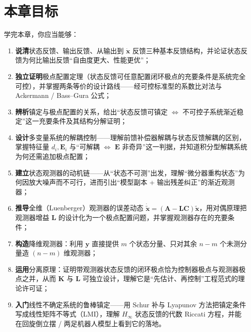 \section*{本章目标}
学完本章，你应当能够：
\begin{enumerate}
  \item \textbf{说清}状态反馈、输出反馈、从输出到 $\dot{\mathbf x}$ 反馈三种基本反馈结构，并论证状态反馈为何比输出反馈“自由度更大、性能更优”；
  \item \textbf{独立证明}极点配置定理（状态反馈可任意配置闭环极点的充要条件是系统完全可控），并掌握两条等价的设计路线——经可控标准型的系数比对法与 Ackermann / Bass--Gura 公式；
  \item \textbf{辨析}镇定与极点配置的关系，给出“状态反馈可镇定 $\iff$ 不可控子系统渐近稳定”这一充要条件及其结构分解证明；
  \item \textbf{设计}多变量系统的解耦控制——理解前馈补偿器解耦与状态反馈解耦的区别，掌握特征量 $d_i,\mathbf E_i$ 与“可解耦 $\iff$ $\mathbf E$ 非奇异”这一判据，并知道积分型解耦系统为何还需追加极点配置；
  \item \textbf{建立}状态观测器的动机链——从“状态不可测”出发，理解“微分器重构状态”为何因放大噪声而不可行，进而引出“模型副本 + 输出残差纠正”的渐近观测器；
  \item \textbf{推导}全维（Luenberger）观测器的误差动态 $\dot{\tilde{\mathbf x}}=(\mathbf A-\mathbf L\mathbf C)\tilde{\mathbf x}$，用对偶原理把观测器增益 $\mathbf L$ 的设计化为一个极点配置问题，并掌握观测器存在的充要条件；
  \item \textbf{构造}降维观测器：利用 $\mathbf y$ 直接提供 $m$ 个状态分量、只对其余 $n-m$ 个未测分量造 $(n-m)$ 维观测器；
  \item \textbf{运用}分离原理：证明带观测器状态反馈的闭环极点恰为控制器极点与观测器极点之并，从而 $\mathbf K$ 与 $\mathbf L$ 可独立设计，理解它是“先估计、再控制”工程范式的理论许可证；
  \item \textbf{入门}线性不确定系统的鲁棒镇定——用 Schur 补与 Lyapunov 方法把镇定条件写成线性矩阵不等式（LMI），理解 $H_\infty$ 状态反馈的代数 Riccati 方程，并能在回旋倒立摆 / 两足机器人模型上看到它的落地。
\end{enumerate}

